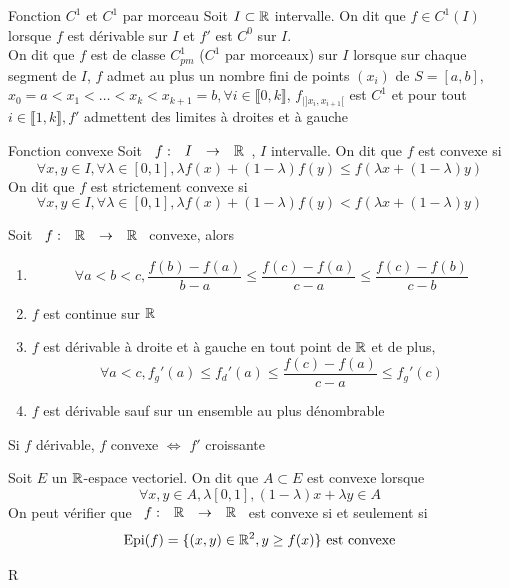 \documentclass[]{report}
\begin{document}
\begin{df}{Fonction $C^1$ et $C^1$ par morceau}{}
    Soit $I\subset \mathbb{R}$ intervalle. On dit que $f\in C^1(I)$ lorsque $f$ est dérivable sur $I$ et $f'$ est $C^0$ sur $I$.\\
    On dit que $f$ est de classe $C^1_{pm}$ ($C^1$ par morceaux) sur $I$ lorsque sur chaque segment de $I$, $f$ admet au plus un nombre fini de points $(x_i)$ de $S=[a,b]$, $x_0=a<x_1<\ldots< x_k <x_{k+1}=b,\forall i\in \llbracket 0,k\rrbracket$, $f_{|]x_i,x_{i+1}[}$ est $C^1$ et pour tout $i\in\llbracket 1,k\rrbracket,f'$ admettent des limites à droites et à gauche
\end{df}

\begin{df}{Fonction convexe}{}
    Soit $\begin{array}{ccccc} f : & I & \to & \mathbb{R} \end{array}$, $I$ intervalle. On dit que $f$ est convexe si
    \[\forall x,y\in I,\forall \lambda\in [0,1], \lambda f(x)+(1-\lambda) f(y)\le f(\lambda x+(1-\lambda) y)\]
    On dit que $f$ est strictement convexe si
    \[\forall x,y\in I,\forall \lambda\in [0,1], \lambda f(x)+(1-\lambda) f(y)< f(\lambda x+(1-\lambda) y)\]
\end{df}

\begin{prop}{}{}
    Soit $\begin{array}{ccccc} f : & \mathbb{R} & \to & \mathbb{R} \end{array}$ convexe, alors
    \begin{enumerate}
        \item \[\forall a<b<c, \frac{f(b)-f(a)}{b-a}\le \frac{f(c)-f(a)}{c-a}\le \frac{f(c)-f(b)}{c-b}\]
        \item $f$ est continue sur $\mathbb{R}$
        \item $f$ est dérivable à droite et à gauche en tout point de $\mathbb{R}$ et de plus,
              \[\forall a<c,f_g'(a)\le f_d'(a)\le \frac{f(c)-f(a)}{c-a}\le f_g'(c)\]
        \item $f$ est dérivable sauf sur un ensemble au plus dénombrable
    \end{enumerate}
\end{prop}

\begin{prop}{}{}
    Si $f$ dérivable, $f$ convexe $\iff $ $f'$ croissante
\end{prop}

\begin{df}{}{}
    Soit $E$ un $\mathbb{R}$-espace vectoriel. On dit que $A\subset E$ est convexe lorsque
    \[\forall x,y\in A, \lambda [0,1], (1-\lambda)x+\lambda y\in A\]
    On peut vérifier que $\begin{array}{ccccc} f : & \mathbb{R} & \to & \mathbb{R} \end{array}$ est convexe si et seulement si
    \[\text{Epi}(f)=\{(x,y)\in \mathbb{R}^2,y\ge f(x)\}\text{ est convexe}\]
\end{df}R
\end{document}
